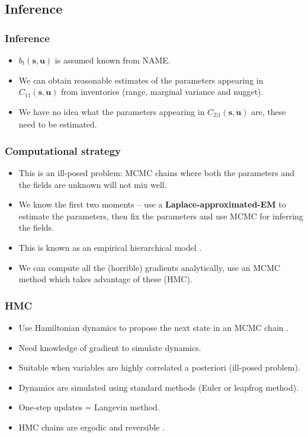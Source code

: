 \documentclass{beamer}
\newcommand{\svec} {\textbf{s}}
\newcommand{\uvec} {\textbf{u}}
\begin{document}
\subsection{Inference}

\begin{frame}
\frametitle{Inference}

\begin{itemize}
\item $b_t(\svec,\uvec)$ is assumed known from NAME. \vfill
\item We can obtain reasonable estimates of the parameters appearing in $C_{11}(\svec,\uvec)$ from inventories (range, marginal variance and nugget). \vfill
\item We have no idea what the parameters appearing in $C_{2|1}(\svec,\uvec)$ are, these need to be estimated. \vfill
\end{itemize}
\end{frame}

\begin{frame}
\frametitle{Computational strategy}

\begin{itemize}
\item This is an ill-posed problem: MCMC chains where both the parameters and the fields are unknown will not mix well. \pause \vfill 
\item We know the first two moments -- use a {\bf Laplace-approximated-EM} to estimate the parameters, then fix the parameters and use MCMC for inferring the fields. \vfill \pause
\item This is known as an empirical hierarchical model \citep[EHM][]{CressieWikle2011}. \vfill \pause
\item We can compute all the (horrible) gradients analytically, use an MCMC method which takes advantage of these (HMC). \vfill
\end{itemize}
\end{frame}

\begin{frame}
\frametitle{HMC}

\begin{itemize}
\item Use Hamiltonian dynamics to propose the next state in an MCMC chain \citep{Duane_1987}.
\item Need knowledge of gradient to simulate dynamics.
\item Suitable when variables are highly correlated a posteriori (ill-posed problem).
\item Dynamics are simulated using standard methods (Euler or leapfrog method).
\item One-step updates = Langevin method.
\item HMC chains are ergodic and reversible \citep{Neal_2011}.
\end{itemize}
\end{frame}
\end{document}
